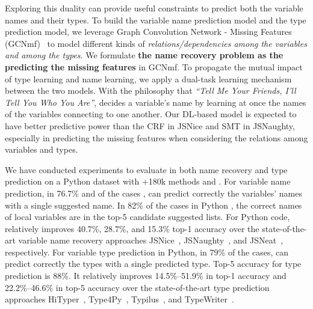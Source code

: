 %

Exploring this duality can provide useful constraints to predict both
the variable names and their types.  To build the variable name
prediction model and the type prediction model, we leverage Graph
Convolution Network - Missing Features (GCNmf)~\cite{GCNmf} to model
different kinds of {\em relations/dependencies among the variables and
  among the types}. We formulate {\bf the name recovery problem as the
  predicting the missing features} in GCNmf. To propagate the mutual
impact of type learning and name learning, we apply a dual-task
learning mechanism between the two models.
%
With the philosophy that {\em ``Tell Me Your Friends, I'll Tell You Who
  You Are''}, {\tool} decides a variable's name by learning at once
the names of the variables connecting to one another.
%
Our DL-based model is expected to have better predictive power than
the CRF in JSNice and SMT in JSNaughty, especially in predicting the
missing features when considering the relations among variables and
types.

We have conducted experiments to evaluate {\tool} in both name
recovery and type prediction on a Python dataset with +180k methods
and {\color{blue}{and a JavaScript (JS) dataset with 322k
    files}}. For variable name prediction, in 76.7\% and
{\color{blue}{81.6\%}}
of the cases {\color{blue}{in Python and JS code respectively}},
{\tool} can predict correctly the variables' names with a single
suggested name. In 82\% {\color{blue}{and 83.3\%}} of the cases in
Python {\color{blue}{and JS code}}, the correct names of local
variables are in the top-5 candidate suggested lists. For Python code,
{\tool} relatively improves 40.7\%, 28.7\%, and 15.3\% top-1 accuracy
over the state-of-the-art variable name recovery approaches
JSNice~\cite{JSNice2015}, JSNaughty~\cite{JSNaughty2017}, and
JSNeat~\cite{icse19}, respectively.
%
{\color{blue}{For JS code, the relative improvements over those
    baselines are 49.7\%, 36.9\%, and 7.7\%, respectively.}}
%
For variable type prediction in Python, in 79\% of the cases, {\tool}
can predict correctly the types with a single predicted type. Top-5
accuracy for type prediction is 88\%. It relatively improves
14.5\%--51.9\% in top-1 accuracy and 22.2\%--46.6\% in top-5 accuracy
over the state-of-the-art type prediction approaches
HiTyper~\cite{HiTyper-icse22}, Type4Py~\cite{Type4Py-icse22},
Typilus~\cite{typilus-pldi20}, and TypeWriter~\cite{typewriter-fse20}.

